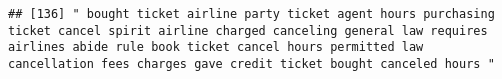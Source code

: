 \documentclass[
]{article}
\begin{document}
\begin{verbatim}
## [136] " bought ticket airline party ticket agent hours purchasing ticket cancel spirit airline charged canceling general law requires airlines abide rule book ticket cancel hours permitted law cancellation fees charges gave credit ticket bought canceled hours "                                                                                                                                                                                                                                                                                                                                                                                                                                                                                                                                                                                                                                                                                                                                                                                                                                                                                                                                                                                                                                                                                                                                                                                                                                                                                                                                                                                                                                                                                                                                 

\end{verbatim}
\end{document}
